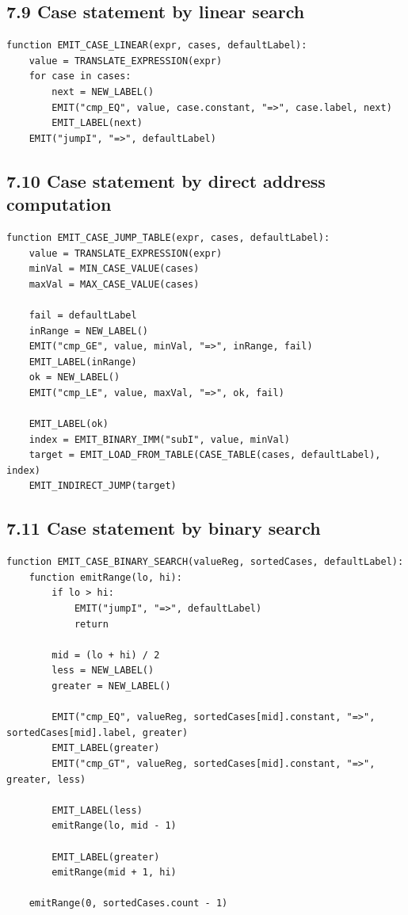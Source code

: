 \documentclass[10pt,letterpaper]{article}
\begin{document}
\subsection*{7.9 Case statement by linear search}

\begin{verbatim}
function EMIT_CASE_LINEAR(expr, cases, defaultLabel):
    value = TRANSLATE_EXPRESSION(expr)
    for case in cases:
        next = NEW_LABEL()
        EMIT("cmp_EQ", value, case.constant, "=>", case.label, next)
        EMIT_LABEL(next)
    EMIT("jumpI", "=>", defaultLabel)
\end{verbatim}

\subsection*{7.10 Case statement by direct address computation}

\begin{verbatim}
function EMIT_CASE_JUMP_TABLE(expr, cases, defaultLabel):
    value = TRANSLATE_EXPRESSION(expr)
    minVal = MIN_CASE_VALUE(cases)
    maxVal = MAX_CASE_VALUE(cases)

    fail = defaultLabel
    inRange = NEW_LABEL()
    EMIT("cmp_GE", value, minVal, "=>", inRange, fail)
    EMIT_LABEL(inRange)
    ok = NEW_LABEL()
    EMIT("cmp_LE", value, maxVal, "=>", ok, fail)

    EMIT_LABEL(ok)
    index = EMIT_BINARY_IMM("subI", value, minVal)
    target = EMIT_LOAD_FROM_TABLE(CASE_TABLE(cases, defaultLabel), index)
    EMIT_INDIRECT_JUMP(target)
\end{verbatim}

\subsection*{7.11 Case statement by binary search}

\begin{verbatim}
function EMIT_CASE_BINARY_SEARCH(valueReg, sortedCases, defaultLabel):
    function emitRange(lo, hi):
        if lo > hi:
            EMIT("jumpI", "=>", defaultLabel)
            return

        mid = (lo + hi) / 2
        less = NEW_LABEL()
        greater = NEW_LABEL()

        EMIT("cmp_EQ", valueReg, sortedCases[mid].constant, "=>", sortedCases[mid].label, greater)
        EMIT_LABEL(greater)
        EMIT("cmp_GT", valueReg, sortedCases[mid].constant, "=>", greater, less)

        EMIT_LABEL(less)
        emitRange(lo, mid - 1)

        EMIT_LABEL(greater)
        emitRange(mid + 1, hi)

    emitRange(0, sortedCases.count - 1)
\end{verbatim}
\end{document}
